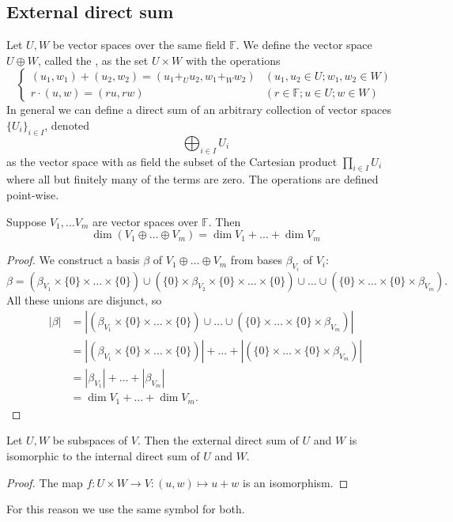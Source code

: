 \subsection{External direct sum}
\begin{definition}
Let $U,W$ be vector spaces over the same field $\mathbb{F}$. We define the vector space  $U\oplus W$, called the , as the set $U\times W$ with the operations
\[ \begin{cases}
(u_1,w_1) + (u_2, w_2) = (u_1 +_U u_2, w_1 +_W w_2) & (u_1,u_2 \in U; w_1, w_2 \in W) \\
r\cdot (u,w) = (ru, rw) & (r\in \mathbb{F}; u\in U; w \in W)
\end{cases} \]
In general we can define a direct sum of an arbitrary collection of vector spaces $\{U_i\}_{i\in I}$, denoted
\[ \bigoplus_{i\in I}U_i \]
as the vector space with as field the subset of the Cartesian product $\prod_{i\in I}U_i$ where all but finitely many of the terms are zero. The operations are defined point-wise.
\end{definition}

\begin{proposition}
Suppose $V_1, \ldots V_m$ are vector spaces over $\mathbb{F}$. Then
\[ \dim(V_1\oplus\ldots \oplus V_m) = \dim V_1 + \ldots + \dim V_m \]
\label{prop:dimDirectSum}
\end{proposition}
\begin{proof}
We construct a basis $\beta$ of $V_1\oplus\ldots \oplus V_m$ from bases $\beta_{V_i}$ of $V_i$:
\[ \beta = (\beta_{V_1} \times \{0 \} \times \ldots \times \{0 \}) \cup (\{0 \} \times \beta_{V_2}\times \{0 \} \times \ldots \times \{0 \}) \cup \ldots \cup (\{0 \}\times \ldots \times \{0 \} \times \beta_{V_m}). \]
All these unions are disjunct, so
\begin{align*}
|\beta| &= |(\beta_{V_1} \times \{0 \} \times \ldots \times \{0 \}) \cup  \ldots \cup (\{0 \}\times \ldots \times \{0 \} \times \beta_{V_m})| \\
&= |(\beta_{V_1} \times \{0 \} \times \ldots \times \{0 \})| + \ldots + |(\{0 \}\times \ldots \times \{0 \} \times \beta_{V_m})| \\
&= | \beta_{V_1}| + \ldots + |\beta_{V_m}| \\
&= \dim V_1 + \ldots + \dim V_m.
\end{align*}
\end{proof}

\begin{proposition}
Let $U,W$ be subspaces of $V$. Then the external direct sum of $U$ and $W$ is isomorphic to the internal direct sum of $U$ and $W$.
\end{proposition}
\begin{proof}
The map $f: U\times W\to V: (u,w) \mapsto u+w$ is an isomorphism.
\end{proof}
For this reason we use the same symbol for both.

